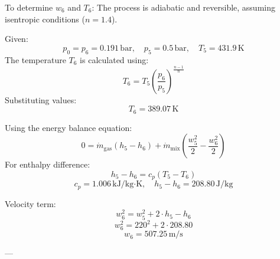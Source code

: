 To determine \( w_6 \) and \( T_6 \):  
The process is adiabatic and reversible, assuming isentropic conditions (\( n = 1.4 \)).  

Given:  
\[
p_0 = p_6 = 0.191 \, \text{bar}, \quad p_5 = 0.5 \, \text{bar}, \quad T_5 = 431.9 \, \text{K}
\]  
The temperature \( T_6 \) is calculated using:  
\[
T_6 = T_5 \left( \frac{p_6}{p_5} \right)^{\frac{n-1}{n}}
\]  
Substituting values:  
\[
T_6 = 389.07 \, \text{K}
\]  

Using the energy balance equation:  
\[
0 = \dot{m}_{\text{gas}} \left( h_5 - h_6 \right) + \dot{m}_{\text{mix}} \left( \frac{w_5^2}{2} - \frac{w_6^2}{2} \right)
\]  
For enthalpy difference:  
\[
h_5 - h_6 = c_p \left( T_5 - T_6 \right)
\]  
\[
c_p = 1.006 \, \text{kJ}/\text{kg·K}, \quad h_5 - h_6 = 208.80 \, \text{J}/\text{kg}
\]  

Velocity term:  
\[
w_6^2 = w_5^2 + 2 \cdot h_5 - h_6
\]  
\[
w_6^2 = 220^2 + 2 \cdot 208.80
\]  
\[
w_6 = 507.25 \, \text{m/s}
\]

---
